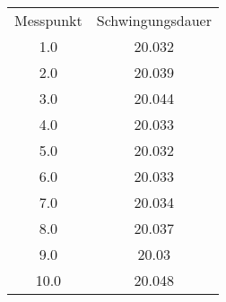 \begin{table}
\begin{tabular}{cc}
Messpunkt & Schwingungsdauer \\
1.0 & 20.032 \\
2.0 & 20.039 \\
3.0 & 20.044 \\
4.0 & 20.033 \\
5.0 & 20.032 \\
6.0 & 20.033 \\
7.0 & 20.034 \\
8.0 & 20.037 \\
9.0 & 20.03 \\
10.0 & 20.048 \\
\end{tabular}
\end{table}
